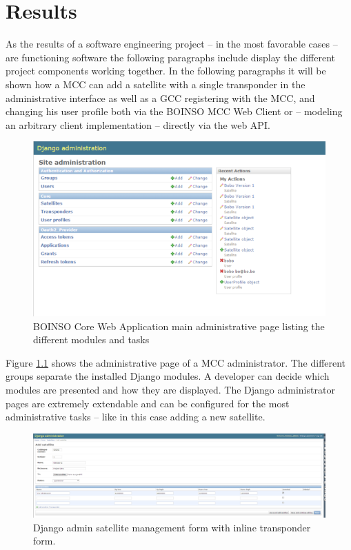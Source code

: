 \documentclass[BachelorPaper]{subfiles}
\begin{document}
\chapter{Results}
As the results of a software engineering project -- in the most favorable cases -- are functioning software the following paragraphs include display the different project components working together. In the following paragraphs it will be shown how a \ac{MCC} can add a satellite with a single transponder in the administrative interface as well as a \ac{GCC} registering with the \ac{MCC}, and changing his user profile both via the BOINSO MCC Web Client or -- modeling an arbitrary client implementation -- directly via the web \ac{API}. \\

\begin{figure}[!htbp]
\centering
\includegraphics[width=0.96\linewidth]{PICs/BacPics/results/admin_1.png}
\caption{BOINSO Core Web Application main administrative page listing the different modules and tasks}\label{fig:admin_1}
\end{figure}

Figure \ref{fig:admin_1} shows the administrative page of a \ac{MCC} administrator. The different groups separate the installed Django modules. A developer can decide which modules are presented and how they are displayed. The Django administrator pages are extremely extendable and can be configured for the most administrative tasks -- like in this case adding a new satellite.

\begin{figure}[!htbp]
\centering
\includegraphics[width=0.96\linewidth]{PICs/BacPics/results/admin_2.png}
\caption{Django admin satellite management form with inline transponder form.}\label{fig:admin_2}
\end{figure}
\end{document}
